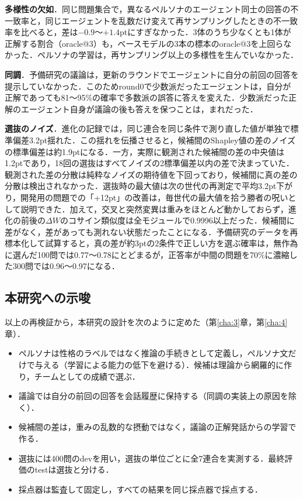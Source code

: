 \textbf{多様性の欠如}．同じ問題集合で，異なるペルソナのエージェント同士の回答の不一致率と，同じエージェントを乱数だけ変えて再サンプリングしたときの不一致率を比べると，差は$-0.9$〜$+1.4$ptにすぎなかった．3体のうち少なくとも1体が正解する割合（oracle@3）も，ベースモデルの3本の標本のoracle@3を上回らなかった．ペルソナの学習は，再サンプリング以上の多様性を生んでいなかった．

\textbf{同調}．予備研究の議論は，更新のラウンドでエージェントに自分の前回の回答を提示していなかった．このためround0で少数派だったエージェントは，自分が正解であっても81〜95\%の確率で多数派の誤答に答えを変えた．少数派だった正解のエージェント自身が議論の後も答えを保つことは，まれだった．

\textbf{選抜のノイズ}．進化の記録では，同じ連合を同じ条件で測り直した値が単独で標準偏差3.2pt揺れた．この揺れを伝播させると，候補間のShapley値の差のノイズの標準偏差は約1.9ptになる．一方，実際に観測された候補間の差の中央値は1.2ptであり，18回の選抜はすべてノイズの2標準偏差以内の差で決まっていた．観測された差の分散は純粋なノイズの期待値を下回っており，候補間に真の差の分散は検出されなかった．選抜時の最大値は次の世代の再測定で平均3.2pt下がり，開発用の問題での「+12pt」の改善は，毎世代の最大値を拾う勝者の呪いとして説明できた．加えて，交叉と突然変異は重みをほとんど動かしておらず，進化の前後の$\Delta W$のコサイン類似度は全モジュールで0.9996以上だった．候補間に差がなく，差があっても測れない状態だったことになる．予備研究のデータを再標本化して試算すると，真の差が約3ptの2条件で正しい方を選ぶ確率は，無作為に選んだ100問では0.77〜0.78にとどまるが，正答率が中間の問題を70\%に濃縮した300問では0.96〜0.97になる．

\subsection{本研究への示唆}
\label{sec:5.1.4}

以上の再検証から，本研究の設計を次のように定めた（第\ref{cha:3}章，第\ref{cha:4}章）．
\begin{itemize}
\item ペルソナは性格のラベルではなく推論の手続きとして定義し，ペルソナ文だけで与える（学習による能力の低下を避ける）．候補は理論から網羅的に作り，チームとしての成績で選ぶ．
\item 議論では自分の前回の回答を会話履歴に保持する（同調の実装上の原因を除く）．
\item 候補間の差は，重みの乱数的な摂動ではなく，議論の正解発話からの学習で作る．
\item 選抜には400問のdevを用い，選抜の単位ごとに全7連合を実測する．最終評価のtestは選抜と分ける．
\item 採点器は監査して固定し，すべての結果を同じ採点器で採点する．
\end{itemize}

